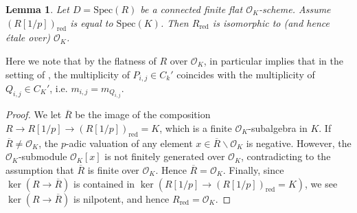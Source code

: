 \documentclass[11pt, letterpaper]{amsart}
\theoremstyle{plain}
\newtheorem{lemma}[theorem]{Lemma}
\theoremstyle{definition}
\newcommand{\Spec}{\mathrm{Spec}}
\newcommand{\<}{\langle}
\renewcommand{\>}{\rangle}
\newcommand{\sO}{\mathcal{O}}
\begin{document}
\begin{lemma}
	\label{lem:finite_flat_O_K_scheme}
	Let $D=\Spec(R)$ be a connected finite flat $\sO_K$-scheme.
	Assume $(R[1/p])_\mathrm{red}$ is equal to $\Spec(K)$.
	Then $R_\mathrm{red}$ is isomorphic to (and hence \'etale over) $\sO_K$.
\end{lemma}
Here we note that by the flatness of $R$ over $\sO_K$,  in particular implies that in the setting of , the multiplicity of $P_{i,j}\in C_k'$ coincides with the multiplicity of $Q_{i,j}\in C_K'$, i.e. $m_{i,j}=m_{Q_{i,j}}$.
\begin{proof}
We let $\overline{R}$ be the image of the composition $R\to R[1/p] \to (R[1/p])_\mathrm{red}=K$, which is a finite $\mathcal{O}_K$-subalgebra in $K$.
If $\overline{R}\neq \sO_K$, the $p$-adic valuation of any element $x\in \overline{R}\smallsetminus \sO_K$ is negative.
However, the $\sO_K$-submodule $\sO_K[x]$ is not finitely generated over $\sO_K$, contradicting to the assumption that $\overline{R}$ is finite over $\sO_K$.
Hence $\overline{R}=\sO_K$.
Finally, since $\ker(R\to \overline{R})$ is contained in $\ker(R[1/p]\to (R[1/p])_\mathrm{red}=K)$, we see $\ker(R\to \overline{R})$ is nilpotent, and hence $R_{\mathrm{red}}=\sO_K$.
\end{proof}
\end{document}
